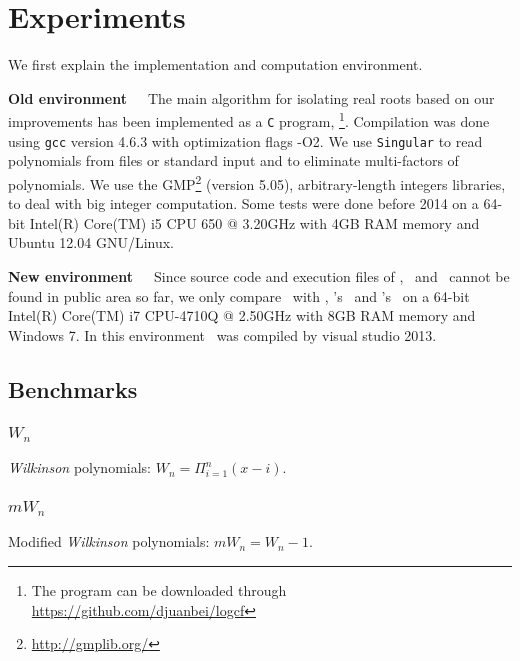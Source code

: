 
\section{Experiments}


We first explain the implementation and computation environment.

{\bf Old environment}\ \ \ 
The main algorithm for isolating real roots based on our improvements has been implemented as a \texttt{C} program, \froot \footnote{The program can be downloaded through \url{https://github.com/djuanbei/logcf}}. Compilation was done using {\tt gcc} version 4.6.3 with optimization flags -O2.
We use {\tt Singular} \cite{singular} to read polynomials from files or standard input and to eliminate multi-factors of polynomials. We use the GMP\footnote{ \url{http://gmplib.org/}}
(version 5.05), arbitrary-length integers libraries, to deal with big integer computation.
Some tests were done before 2014   on a 64-bit Intel(R) Core(TM) i5 CPU 650 @ 3.20GHz with 4GB RAM memory and Ubuntu 12.04 GNU/Linux.

{\bf New environment}\ \ \ 
Since   source code and execution files
	of    \eign, \cf\ and \sle\  cannot be found in public area so far, we only compare \froot\ with \AND, \MM's \inte\  and  \MAPLE's \REALROOT\  on   a 64-bit Intel(R) Core(TM) i7 CPU-4710Q @ 2.50GHz with 8GB RAM memory and Windows 7. In this environment \froot\ was compiled by visual studio 2013.

\subsection{Benchmarks }
 \subsubsection{$W_n$}
 {\it Wilkinson} polynomials: $W_n=\Pi_{i=1}^n(x-i)$. %
  \subsubsection{$mW_n$}
  Modified {\it Wilkinson} polynomials: $mW_n=W_n-1$.

